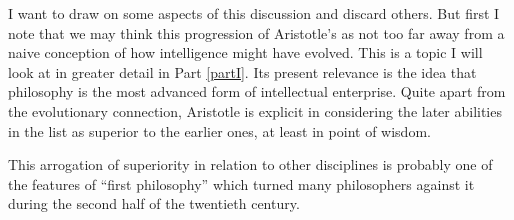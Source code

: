 I want to draw on some aspects of this discussion and discard others.
But first I note that we may think this progression of Aristotle's as not too far away from a naive conception of how intelligence might have evolved.
This is a topic I will look at in greater detail in Part \ref{partI}.
Its present relevance is the idea that philosophy is the most advanced form of intellectual enterprise.
Quite apart from the evolutionary connection, Aristotle is explicit in considering the later abilities in the list as superior to the earlier ones, at least in point of wisdom.

This arrogation of superiority in relation to other disciplines is probably one of the features of ``first philosophy'' which turned many philosophers against it during the second half of the twentieth century.

\label{partI}\label{partII}\label{partIII}\label{partIV}\label{partV}
